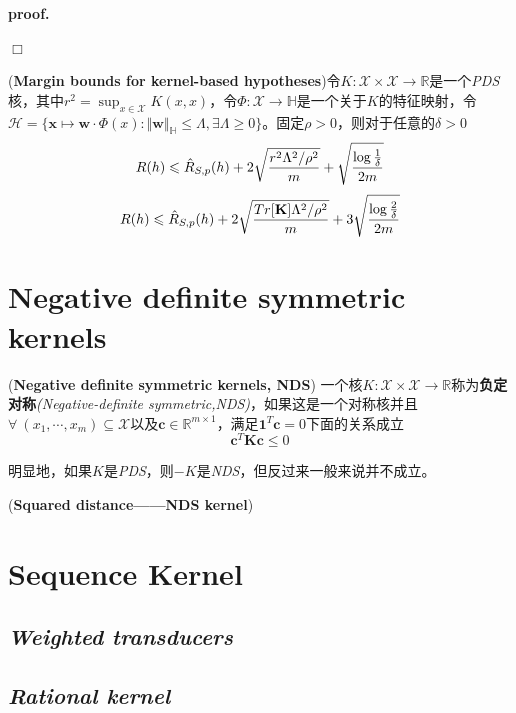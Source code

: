 \textbf{proof.}\hspace{1em} 

$\Box$

\begin{mdframed}
    \begin{corollary}
        (\textbf{Margin bounds for kernel-based hypotheses})令$K:\mathcal{X}\times \mathcal{X}\rightarrow\mathbb{R}$是一个\textsl{PDS}核，其中$r^2=\sup_{x\in \mathcal{X}}K(x,x)$，令$\Phi:\mathcal{X}\rightarrow \mathbb{H}$是一个关于$K$的特征映射，令$\mathcal{H}=\{\mathbf{x}\mapsto \mathbf{w}\cdot \Phi(x):\Vert \mathbf{w}\Vert_\mathbb{H}\leqslant \Lambda,\exists \Lambda\geqslant 0\}$。固定$\rho>0$，则对于任意的$\delta>0$
        \begin{equation}
            R(h)\leqslant \hat{R}_{S,p}(h)+2\sqrt{\frac{r^2\Lambda^2/\rho^2}{m}}+\sqrt{\frac{\log \frac{1}{\delta}}{2m}} \\
        \end{equation}
        \begin{equation}
            R(h)\leqslant \hat{R}_{S,p}(h)+2\sqrt{\frac{Tr[\mathbf{K}]\Lambda^2/\rho^2}{m}}+3\sqrt{\frac{\log \frac{2}{\delta}}{2m}} \\
        \end{equation}
    \end{corollary}
\end{mdframed}


\section{Negative definite symmetric kernels}

\begin{define}
    (\textbf{Negative definite symmetric kernels, NDS}) 一个核$K:\mathcal{X}\times \mathcal{X}\rightarrow \mathbb{R}$称为\textbf{负定对称}\textsl{(Negative-definite symmetric,NDS)}，如果这是一个对称核并且$\forall\ (x_1,\cdots,x_m)\subseteq \mathcal{X}$以及$\mathbf{c}\in \mathbb{R}^{m\times 1}$，满足$\mathbf{1}^T\mathbf{c}=0$下面的关系成立
    \begin{equation}
        \mathbf{c}^T\mathbf{K}\mathbf{c}\leqslant 0
    \end{equation}
\end{define}

明显地，如果$K$是\textsl{PDS}，则$-K$是\textsl{NDS}，但反过来一般来说并不成立。

\begin{example}
    (\textbf{Squared distance——NDS kernel})\hspace{0.5em} 
\end{example}

\section{Sequence Kernel}

\subsection*{\textsl{Weighted transducers}}

\subsection*{\textsl{Rational kernel}}